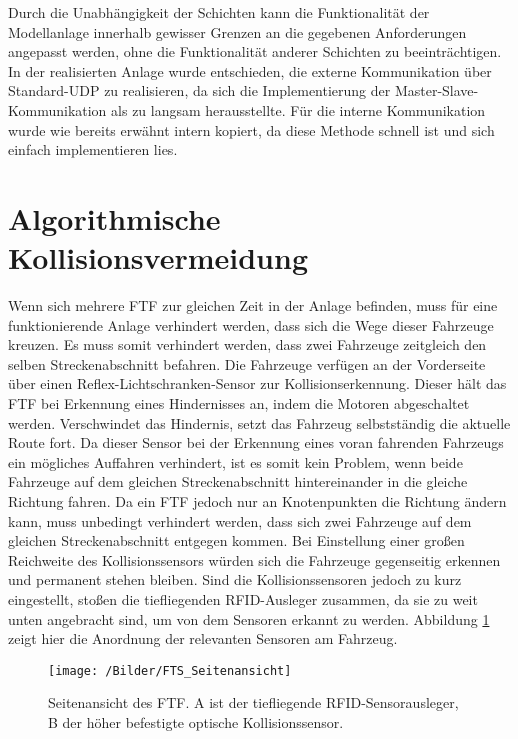		Durch die Unabhängigkeit der Schichten kann die Funktionalität der Modellanlage innerhalb gewisser Grenzen an die gegebenen Anforderungen angepasst werden, ohne die Funktionalität anderer Schichten zu beeinträchtigen. In der realisierten Anlage wurde entschieden, die externe Kommunikation über Standard-\ac{UDP} zu realisieren, da sich die Implementierung der Master-Slave-Kommunikation als zu langsam herausstellte. Für die interne Kommunikation wurde wie bereits erwähnt intern kopiert, da diese Methode schnell ist und sich einfach implementieren lies.

\section{Algorithmische Kollisionsvermeidung}
	\label{Kollisionsvermeidung}
		
	Wenn sich mehrere \ac{FTF} zur gleichen Zeit in der Anlage befinden, muss für eine funktionierende Anlage verhindert werden, dass sich die Wege dieser Fahrzeuge kreuzen. Es muss somit verhindert werden, dass zwei Fahrzeuge zeitgleich den selben Streckenabschnitt befahren.  Die Fahrzeuge verfügen an der Vorderseite über einen Reflex-Lichtschranken-Sensor zur Kollisionserkennung. Dieser hält das \ac{FTF} bei Erkennung eines Hindernisses an, indem die Motoren abgeschaltet werden. Verschwindet das Hindernis, setzt das Fahrzeug selbstständig die aktuelle Route fort. Da dieser Sensor bei der Erkennung eines voran fahrenden Fahrzeugs ein mögliches Auffahren verhindert, ist es somit kein Problem, wenn beide Fahrzeuge auf dem gleichen Streckenabschnitt hintereinander in die gleiche Richtung fahren. Da ein \ac{FTF} jedoch nur an Knotenpunkten die Richtung ändern kann, muss unbedingt verhindert werden, dass sich zwei Fahrzeuge auf dem gleichen Streckenabschnitt entgegen kommen. Bei Einstellung einer großen Reichweite des Kollisionssensors  würden sich die Fahrzeuge gegenseitig erkennen und permanent stehen bleiben. Sind die Kollisionssensoren jedoch zu kurz eingestellt, stoßen die tiefliegenden \ac{RFID}-Ausleger zusammen, da sie zu weit unten angebracht sind, um von dem Sensoren erkannt zu werden. Abbildung \ref{FTS Seite Sensoren} zeigt hier die Anordnung der relevanten Sensoren am Fahrzeug. 
	
	\begin{figure}[h]
		\centering
		\texttt{[image: /Bilder/FTS\_Seitenansicht]}
		\vspace{0.2cm}
		\caption{Seitenansicht des \ac{FTF}. A ist der tiefliegende \ac{RFID}-Sensorausleger, B der höher befestigte optische Kollisionssensor.} \label{FTS Seite Sensoren}
	\end{figure}
	

